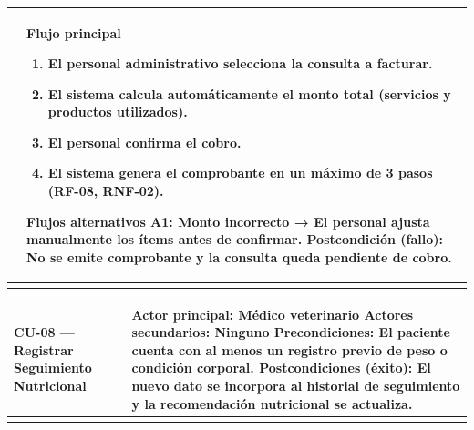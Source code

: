 \documentclass[
]{article}
\newcounter{none} %
\begin{document}
{\def\LTcaptype{none} %
\begin{longtable}[]{@{}
  >{\raggedright\arraybackslash}p{}
  >{\raggedright\arraybackslash}p{}@{}}
\toprule\noalign{}
\begin{minipage}[b]{\linewidth}\raggedright
\end{minipage} & \begin{minipage}[b]{\linewidth}\raggedright
\textbf{Flujo principal}

\begin{enumerate}
\def\labelenumi{\arabic{enumi}.}
\item
  El personal administrativo selecciona la consulta a facturar.
\item
  El sistema calcula automáticamente el monto total (servicios y
  productos utilizados).
\item
  El personal confirma el cobro.
\item
  El sistema genera el comprobante en un máximo de 3 pasos (RF-08,
  RNF-02).
\end{enumerate}

\textbf{Flujos alternativos} A1: Monto incorrecto → El personal ajusta manualmente los ítems antes de
confirmar. \textbf{Postcondición (fallo):} No se emite comprobante y la consulta
queda pendiente de cobro.
\end{minipage} \\
\midrule\noalign{}
\endhead
\bottomrule\noalign{}
\endlastfoot
\end{longtable}
}

{\def\LTcaptype{none} %
\begin{longtable}[]{@{}
  >{\raggedright\arraybackslash}p{}
  >{\raggedright\arraybackslash}p{}@{}}
\toprule\noalign{}
\begin{minipage}[b]{\linewidth}\raggedright
CU-08 --- Registrar Seguimiento Nutricional
\end{minipage} & \begin{minipage}[b]{\linewidth}\raggedright
\textbf{Actor principal:} Médico veterinario \textbf{Actores
secundarios:} Ninguno \textbf{Precondiciones:} El paciente cuenta con al
menos un registro previo de peso o condición corporal. \textbf{Postcondiciones (éxito):} El nuevo dato se incorpora al
historial de seguimiento y la recomendación nutricional se actualiza.
\end{minipage} \\
\midrule\noalign{}
\endhead
\bottomrule\noalign{}
\endlastfoot
\end{longtable}
}
\end{document}
